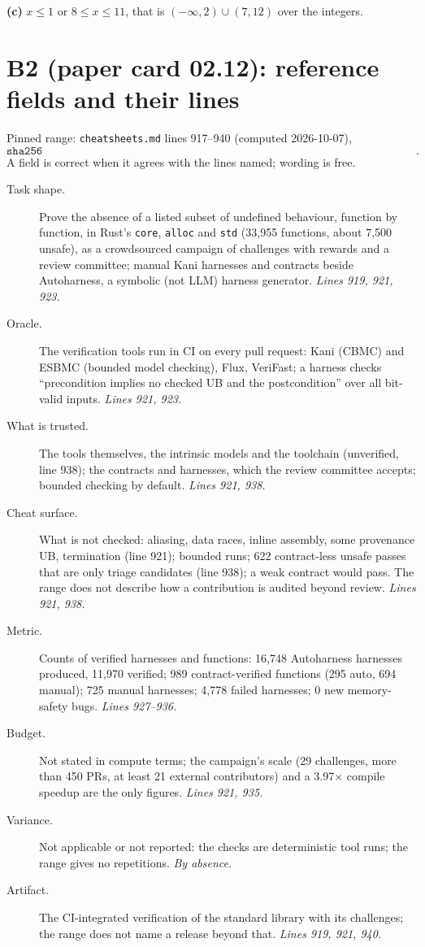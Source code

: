 \documentclass[11pt]{article}
\begin{document}
\textbf{(c)} $x \le 1$ or $8 \le x \le 11$, that is $(-\infty, 2) \cup (7,
12)$ over the integers.

\section*{B2 (paper card 02.12): reference fields and their lines}

Pinned range: \texttt{cheatsheets.md} lines 917--940 (computed 2026-10-07),
\[ \texttt{sha256 74c85732bbbea1c675fb6a81de1502d4bc79834e764184c2c35560b609d1378e}. \]
A field is correct when it agrees with the lines named; wording is free.

\begin{description}
\item[Task shape.] Prove the absence of a listed subset of undefined
  behaviour, function by function, in Rust's \texttt{core}, \texttt{alloc}
  and \texttt{std} (33,955 functions, about 7,500 unsafe), as a crowdsourced
  campaign of challenges with rewards and a review committee; manual Kani
  harnesses and contracts beside Autoharness, a symbolic (not LLM) harness
  generator. \emph{Lines 919, 921, 923.}
\item[Oracle.] The verification tools run in CI on every pull request: Kani
  (CBMC) and ESBMC (bounded model checking), Flux, VeriFast; a harness checks
  ``precondition implies no checked UB and the postcondition'' over all
  bit-valid inputs. \emph{Lines 921, 923.}
\item[What is trusted.] The tools themselves, the intrinsic models and the
  toolchain (unverified, line 938); the contracts and harnesses, which the
  review committee accepts; bounded checking by default. \emph{Lines 921,
  938.}
\item[Cheat surface.] What is not checked: aliasing, data races, inline
  assembly, some provenance UB, termination (line 921); bounded runs; 622
  contract-less unsafe passes that are only triage candidates (line 938); a
  weak contract would pass. The range does not describe how a contribution is
  audited beyond review. \emph{Lines 921, 938.}
\item[Metric.] Counts of verified harnesses and functions: 16,748
  Autoharness harnesses produced, 11,970 verified; 989 contract-verified
  functions (295 auto, 694 manual); 725 manual harnesses; 4,778 failed
  harnesses; 0 new memory-safety bugs. \emph{Lines 927--936.}
\item[Budget.] Not stated in compute terms; the campaign's scale (29
  challenges, more than 450 PRs, at least 21 external contributors) and a
  3.97$\times$ compile speedup are the only figures. \emph{Lines 921, 935.}
\item[Variance.] Not applicable or not reported: the checks are
  deterministic tool runs; the range gives no repetitions. \emph{By absence.}
\item[Artifact.] The CI-integrated verification of the standard library
  with its challenges; the range does not name a release beyond that.
  \emph{Lines 919, 921, 940.}
\end{description}
\end{document}
